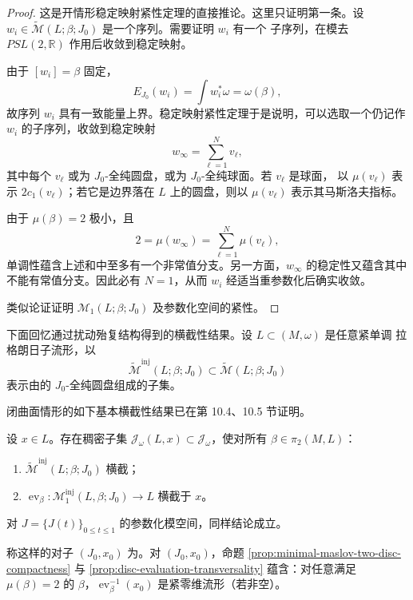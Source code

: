 \begin{proof}
这是开情形稳定映射紧性定理的直接推论。这里只证明第一条。设
$w_i\in\widetilde{\mathcal M}(L;\beta;J_0)$ 是一个序列。需要证明 $w_i$ 有一个
子序列，在模去 $PSL(2,\mathbb R)$ 作用后收敛到稳定映射。

由于 $[w_i]=\beta$ 固定，
\[
 E_{J_0}(w_i)=\int w_i^*\omega=\omega(\beta),
\]
故序列 $w_i$ 具有一致能量上界。稳定映射紧性定理于是说明，可以选取一个仍记作
$w_i$ 的子序列，收敛到稳定映射
\[
 w_\infty=\sum_{\ell=1}^{N}v_\ell,
\]
其中每个 $v_\ell$ 或为 $J_0$-全纯圆盘，或为 $J_0$-全纯球面。若 $v_\ell$ 是球面，
以 $\mu(v_\ell)$ 表示 $2c_1(v_\ell)$；若它是边界落在 $L$ 上的圆盘，则以
$\mu(v_\ell)$ 表示其马斯洛夫指标。

由于 $\mu(\beta)=2$ 极小，且
\[
 2=\mu(w_\infty)=\sum_{\ell=1}^{N}\mu(v_\ell),
\]
单调性蕴含上述和中至多有一个非常值分支。另一方面，$w_\infty$ 的稳定性又蕴含其中
不能有常值分支。因此必有 $N=1$，从而 $w_i$ 经适当重参数化后确实收敛。

类似论证证明 $\mathcal M_1(L;\beta;J_0)$ 及参数化空间的紧性。
\end{proof}

下面回忆通过扰动殆复结构得到的横截性结果。设 $L\subset(M,\omega)$ 是任意紧单调
拉格朗日子流形，以
\[
 \widetilde{\mathcal M}^{\mathrm{inj}}(L;\beta;J_0)
 \subset\widetilde{\mathcal M}(L;\beta;J_0)
\]
表示由\termSomewhereInjective{}的 $J_0$-全纯圆盘组成的子集。

闭曲面情形的如下基本横截性结果已在第 10.4、10.5 节证明。

\begin{proposition}
\label{prop:disc-evaluation-transversality}
设 $x\in L$。存在稠密子集
$\mathcal J_\omega(L,x)\subset\mathcal J_\omega$，使对所有
$\beta\in\pi_2(M,L)$：
\begin{enumerate}[label=(\arabic*)]
\item $\widetilde{\mathcal M}^{\mathrm{inj}}(L;\beta;J_0)$ 横截；
\item $\operatorname{ev}_\beta:\mathcal M_1^{\mathrm{inj}}(L,\beta;J_0)\to L$
横截于 $x$。
\end{enumerate}
对 $J=\{J(t)\}_{0\leq t\leq1}$ 的参数化模空间，同样结论成立。
\end{proposition}

称这样的对子 $(J_0,x_0)$ 为\termTransversePair{}。对\termTransversePair{} $(J_0,x_0)$，命题
\ref{prop:minimal-maslov-two-disc-compactness} 与
\ref{prop:disc-evaluation-transversality} 蕴含：对任意满足 $\mu(\beta)=2$ 的
$\beta$，$\operatorname{ev}_\beta^{-1}(x_0)$ 是紧零维流形（若非空）。

